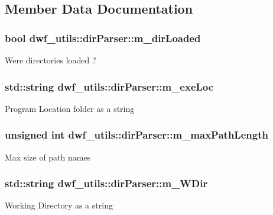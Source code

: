 \subsection{\-Member \-Data \-Documentation}
\hypertarget{classdwf__utils_1_1dir_parser_ae401a84a2c08933ab79b1238ead0d50e}{
\subsubsection[{m\-\_\-dir\-Loaded}]{\setlength{\rightskip}{0pt plus 5cm}bool {\bf dwf\-\_\-utils\-::dir\-Parser\-::m\-\_\-dir\-Loaded}}}\label{classdwf__utils_1_1dir_parser_ae401a84a2c08933ab79b1238ead0d50e}
\-Were directories loaded ? \hypertarget{classdwf__utils_1_1dir_parser_a3143c04d12fbb30e1d23e599eaae4a26}{
\subsubsection[{m\-\_\-exe\-Loc}]{\setlength{\rightskip}{0pt plus 5cm}std\-::string {\bf dwf\-\_\-utils\-::dir\-Parser\-::m\-\_\-exe\-Loc}}}\label{classdwf__utils_1_1dir_parser_a3143c04d12fbb30e1d23e599eaae4a26}
\-Program \-Location folder as a string \hypertarget{classdwf__utils_1_1dir_parser_a943ff3e8c7a9bc09c9a92c4c4fe983c7}{
\subsubsection[{m\-\_\-max\-Path\-Length}]{\setlength{\rightskip}{0pt plus 5cm}unsigned int {\bf dwf\-\_\-utils\-::dir\-Parser\-::m\-\_\-max\-Path\-Length}}}\label{classdwf__utils_1_1dir_parser_a943ff3e8c7a9bc09c9a92c4c4fe983c7}
\-Max size of path names \hypertarget{classdwf__utils_1_1dir_parser_a82f8c1645951c9618306e182145564d8}{
\subsubsection[{m\-\_\-\-W\-Dir}]{\setlength{\rightskip}{0pt plus 5cm}std\-::string {\bf dwf\-\_\-utils\-::dir\-Parser\-::m\-\_\-\-W\-Dir}}}\label{classdwf__utils_1_1dir_parser_a82f8c1645951c9618306e182145564d8}
\-Working \-Directory as a string 

